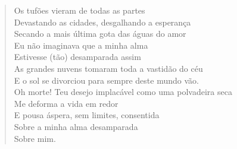 \begin{verse}
Os tufões vieram de todas as partes\\
Devastando as cidades, desgalhando a esperança\\
Secando a mais última gota das águas do amor\\
Eu não imaginava que a minha alma\\
Estivesse (tão) desamparada assim\\
As grandes nuvens tomaram toda a vastidão do céu\\
E o sol se divorciou para sempre deste mundo vão.\\
Oh morte! Teu desejo implacável como uma polvadeira seca\\
Me deforma a vida em redor\\
E pousa áspera, sem limites, consentida\\
Sobre a minha alma desamparada\\
Sobre mim.
\end{verse}



